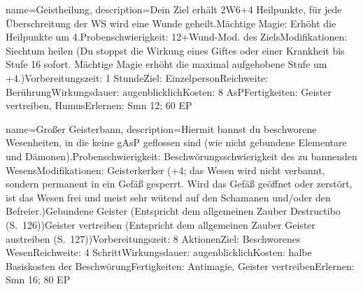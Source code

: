{
    name={Geistheilung},
    description={Dein Ziel erhält 2W6+4 Heilpunkte, für jede Überschreitung der WS wird eine Wunde geheilt.\newline Mächtige Magie: Erhöht die Heilpunkte um 4.\newline Probenschwierigkeit: 12+Wund-Mod. des Ziels\newline Modifikationen: Siechtum heilen (Du stoppst die Wirkung eines Giftes oder einer Krankheit bis Stufe 16 sofort. Mächtige Magie erhöht die maximal aufgehobene Stufe um +4.)\newline Vorbereitungszeit: 1 Stunde\newline Ziel: Einzelperson\newline Reichweite: Berührung\newline Wirkungsdauer: augenblicklich\newline Kosten: 8 AsP\newline Fertigkeiten: Geister vertreiben, Humus\newline Erlernen: Smn 12; 60 EP}
}


{
    name={Großer Geisterbann},
    description={Hiermit bannst du beschworene Wesenheiten, in die keine gAsP geflossen sind (wie nicht gebundene Elementare und Dämonen).\newline Probenschwierigkeit: Beschwörungsschwierigkeit des zu bannenden Wesens\newline Modifikationen: Geisterkerker (+4; das Wesen wird nicht verbannt, sondern permanent in ein Gefäß gesperrt. Wird das Gefäß geöffnet oder zerstört, ist das Wesen frei und meist sehr wütend auf den Schamanen und/oder den Befreier.)\newline Gebundene Geister (Entspricht dem allgemeinen Zauber Destructibo (S. 126))\newline Geister vertreiben (Entspricht dem allgemeinen Zauber Geister austreiben (S. 127))\newline Vorbereitungszeit: 8 Aktionen\newline Ziel: Beschworenes Wesen\newline Reichweite: 4 Schritt\newline Wirkungsdauer: augenblicklich\newline Kosten: halbe Basiskosten der Beschwörung\newline Fertigkeiten: Antimagie, Geister vertreiben\newline Erlernen: Smn 16; 80 EP}
}


